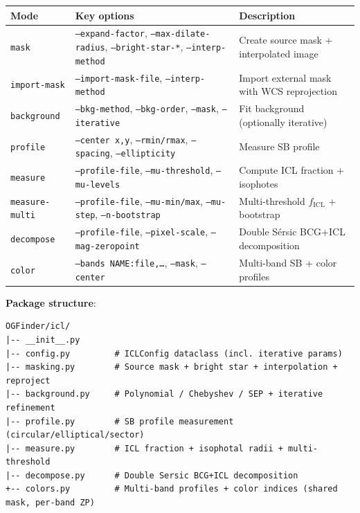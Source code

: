 \documentclass[11pt,fleqn]{book}
\begin{document}
\begin{center}
\begin{longtable}{L{2.2cm} L{3.8cm} L{6.5cm}}
\toprule
\textbf{Mode} & \textbf{Key options} & \textbf{Description} \\
\midrule
\endhead
\texttt{mask} & \texttt{--expand-factor}, \texttt{--max-dilate-radius}, \texttt{--bright-star-*}, \texttt{--interp-method} & Create source mask + interpolated image \\
\midrule
\texttt{import-mask} & \texttt{--import-mask-file}, \texttt{--interp-method} & Import external mask with WCS reprojection \\
\midrule
\texttt{background} & \texttt{--bkg-method}, \texttt{--bkg-order}, \texttt{--mask}, \texttt{--iterative} & Fit background (optionally iterative) \\
\midrule
\texttt{profile} & \texttt{--center x,y}, \texttt{--rmin/rmax}, \texttt{--spacing}, \texttt{--ellipticity} & Measure SB profile \\
\midrule
\texttt{measure} & \texttt{--profile-file}, \texttt{--mu-threshold}, \texttt{--mu-levels} & Compute ICL fraction + isophotes \\
\midrule
\texttt{measure-multi} & \texttt{--profile-file}, \texttt{--mu-min/max}, \texttt{--mu-step}, \texttt{--n-bootstrap} & Multi-threshold $f_\mathrm{ICL}$ + bootstrap \\
\midrule
\texttt{decompose} & \texttt{--profile-file}, \texttt{--pixel-scale}, \texttt{--mag-zeropoint} & Double S\'ersic BCG+ICL decomposition \\
\midrule
\texttt{color} & \texttt{--bands NAME:file,\ldots}, \texttt{--mask}, \texttt{--center} & Multi-band SB + color profiles \\
\bottomrule
\end{longtable}
\end{center}

\textbf{Package structure}:
\begin{codebox}
\begin{lstlisting}[numbers=none]
OGFinder/icl/
|-- __init__.py
|-- config.py         # ICLConfig dataclass (incl. iterative params)
|-- masking.py        # Source mask + bright star + interpolation + reproject
|-- background.py     # Polynomial / Chebyshev / SEP + iterative refinement
|-- profile.py        # SB profile measurement (circular/elliptical/sector)
|-- measure.py        # ICL fraction + isophotal radii + multi-threshold
|-- decompose.py      # Double Sersic BCG+ICL decomposition
+-- colors.py         # Multi-band profiles + color indices (shared mask, per-band ZP)
\end{lstlisting}
\end{codebox}
\end{document}

